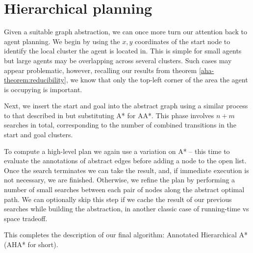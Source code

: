 \section{Hierarchical planning}
Given a suitable graph abstraction, we can once more turn our attention back to agent planning. 
We begin by using the $x,y$ coordinates of the start node to identify the local cluster the agent is located in. This is simple for small agents but large agents may be overlapping across several clusters. Such cases may appear problematic, however, recalling our results from theorem \ref{aha-theorem:reducibility}, we know that only the top-left corner of the area the agent is occupying is important.
\par \indent
Next, we insert the start and goal into the abstract graph using a similar process to that described in \cite{botea04} but substituting A* for AA*. This phase involves $n+m$ searches in total, corresponding to the number of combined transitions in the start and goal clusters.
\par \indent
To compute a high-level plan we again use a variation on A* -- this time to evaluate the annotations of abstract edges before adding a node to the open list.
Once the search terminates we can take the result, and, if immediate execution is not necessary, we are finished. 
Otherwise, we refine the plan by performing a number of small searches between each pair of nodes along the abstract optimal path. 
We can optionally skip this step if we cache the result of our previous searches while building the abstraction, in another classic case of running-time vs space tradeoff. 
\par \indent
This completes the description of our final algorithm: Annotated Hierarchical A* (AHA* for short).
